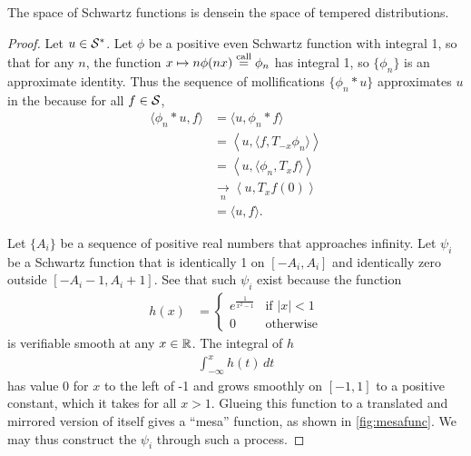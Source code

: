     \begin{thm}
      \label{thm:sdenseinss}
      The space of Schwartz functions is dense\footnotemark in the space of tempered distributions.
    \end{thm}
    \begin{proof}
      Let $u\in\SS$.
      Let $\phi$ be a positive even Schwartz function with integral 1, so that for any $n$, the function $x\mapsto n\phi(nx) \call \phi_n$ has integral 1, so $\{\phi_n\}$ is an approximate identity.
      Thus the sequence of mollifications $\{\phi_n*u\}$ approximates $u$ in the \ws because for all $f\in\S$, 
      \begin{align*}
        \langle \phi_n*u, f\rangle
        &= \langle u, \phi_n*f\rangle
        \\&= \left\langle u, \langle f, T_{-x}\phi_n\rangle \right\rangle
        \\&= \left\langle u, \langle \phi_n, T_{x}f\rangle \right\rangle
        \\&\underset{n}{\longrightarrow} \left\langle u, T_xf(0) \right\rangle
        \\&= \langle u,f\rangle \text{.}
      \end{align*}

      Let $\{A_i\}$ be a sequence of positive real numbers that approaches infinity.
      Let $\psi_i$ be a Schwartz function that is identically 1 on $[-A_i,A_i]$ and identically zero outside $[-A_i-1,A_i+1]$.
      See that such $\psi_i$ exist because the function
      \begin{align*}
        h(x) &=
        \begin{cases}
          e^\frac{1}{x^2-1} &\text{if }|x|<1\\
          0 &\text{otherwise}
        \end{cases}
      \end{align*}
      is verifiable smooth at any $x\in\R$.
      The integral of $h$ 
      \begin{align*}
        \int_{-\infty}^x h(t)\,dt
      \end{align*}
      has value 0 for $x$ to the left of -1 and grows smoothly on $[-1,1]$ to a positive constant, which it takes for all $x>1$.
      Glueing this function to a translated and mirrored version of itself gives a ``mesa'' function, as shown in \cref{fig:mesafunc}.
      We may thus construct the $\psi_i$ through such a process.


\end{proof}
